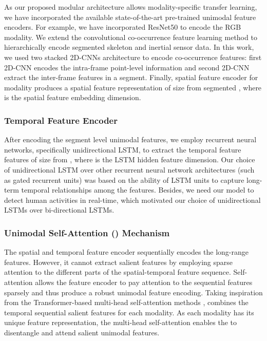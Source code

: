 \documentclass[runningheads]{llncs}
\begin{document}
As our proposed modular architecture allows modality-specific transfer learning, we have incorporated the available state-of-the-art pre-trained unimodal feature encoders. For example, we have incorporated ResNet50 to encode the RGB modality. We extend the convolutional co-occurrence feature learning method \cite{co_occurrence} to hierarchically encode segmented skeleton and inertial sensor data. In this work, we used two stacked 2D-CNNs architecture to encode co-occurrence features: first 2D-CNN encodes the intra-frame point-level information and second 2D-CNN extract the inter-frame features in a segment. Finally, spatial feature encoder for modality  produces a spatial feature representation  of size  from segmented , where  is the spatial feature embedding dimension. 

\subsubsection{Temporal Feature Encoder}
After encoding the segment level unimodal features, we employ recurrent neural networks, specifically unidirectional LSTM, to extract the temporal feature features  of size  from , where  is the LSTM hidden feature dimension. Our choice of unidirectional LSTM over other recurrent neural network architectures (such as gated recurrent units) was based on the ability of LSTM units to capture long-term temporal relationships among the features. Besides, we need our model to detect human activities in real-time, which motivated our choice of unidirectional LSTMs over bi-directional LSTMs. 





\subsubsection{Unimodal Self-Attention ({\uat }) Mechanism}
\label{sec:msa}
The spatial and temporal feature encoder sequentially encodes the long-range features. However, it cannot extract salient features by employing sparse attention to the different parts of the spatial-temporal feature sequence. Self-attention allows the feature encoder to pay attention to the sequential features sparsely and thus produce a robust unimodal feature encoding. Taking inspiration from the Transformer-based multi-head self-attention methods \cite{transformer}, {\uat } combines the temporal sequential salient features for each modality. As each modality has its unique feature representation, the multi-head self-attention enables the {\uat } to disentangle and attend salient unimodal features. 
\end{document}
